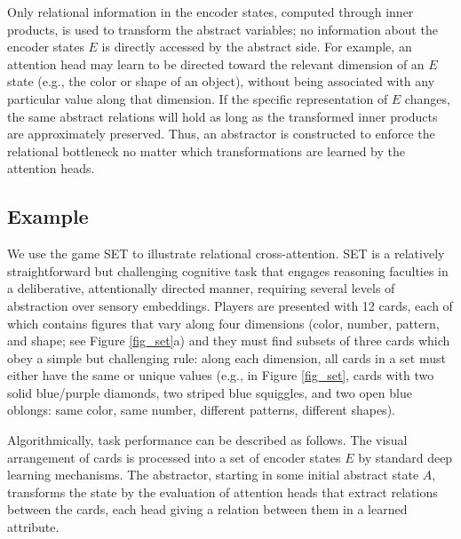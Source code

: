 Only relational information in the encoder states, computed through inner products,
is used to transform the abstract variables; no information about the encoder states $E$ is directly accessed by the abstract side. For example, an attention head may learn to be directed toward the relevant dimension of an $E$ state (e.g., the color or shape of an object), without being associated with any particular value along that dimension. If the specific representation of $E$ changes, the same abstract relations will hold as long as the transformed inner products are approximately preserved. Thus, an abstractor is constructed to enforce the relational bottleneck 
no matter which transformations are learned by the attention heads.



\subsection{Example}
\label{ssec:set}

We use the game SET to illustrate relational cross-attention.
SET is a relatively straightforward but challenging cognitive task that engages reasoning faculties in a deliberative, attentionally directed manner, requiring several levels of abstraction over sensory embeddings. Players are presented with 12 cards, each of which contains figures that vary along four dimensions (color, number, pattern, and shape; see Figure \ref{fig_set}a) and they must find subsets of three cards which obey a simple but challenging rule: along each dimension, all cards in a set must either have the same or unique values (e.g., in Figure \ref{fig_set}, cards with two solid blue/purple diamonds, two striped blue squiggles, and two open blue oblongs: same color, same number, different patterns, different shapes).

Algorithmically, task performance can be described as follows. The visual arrangement of cards is processed into a set of encoder states $E$ by standard deep learning mechanisms. The abstractor, starting in some initial abstract state $A$, transforms the state by the evaluation of attention heads that extract relations between the cards, each head giving a relation between them in a learned attribute.

\def\redcard{\colorbox{red!30}{R}\hskip.2em}
\def\bluecard{\colorbox{blue!30}{B}\hskip.2em}
\def\greencard{\colorbox{green!50}{G}\hskip.2em}
\def\onecard{\fbox{\hskip1pt 1\hskip1pt}\hskip.2em}
\def\twocard{\fbox{\hskip1pt 2\hskip1pt}\hskip.2em}
\def\threecard{\fbox{\hskip1pt 3\hskip1pt}\hskip.2em}

